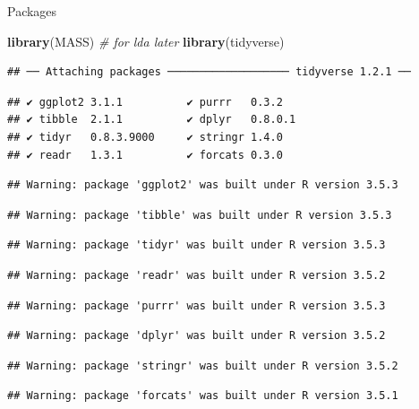 \documentclass[ignorenonframetext,]{beamer}
\newenvironment{Shaded}{\begin{snugshade}}{\end{snugshade}}
\newcommand{\CommentTok}[1]{\textcolor[rgb]{0.56,0.35,0.01}{\textit{#1}}}
\newcommand{\KeywordTok}[1]{\textcolor[rgb]{0.13,0.29,0.53}{\textbf{#1}}}
\newcommand{\NormalTok}[1]{#1}
\begin{document}
\begin{frame}[fragile]{Packages}
\protect\hypertarget{packages-7}{}

\begin{Shaded}
\begin{Highlighting}[]
\KeywordTok{library}\NormalTok{(MASS) }\CommentTok{# for lda later}
\KeywordTok{library}\NormalTok{(tidyverse)}
\end{Highlighting}
\end{Shaded}

\begin{verbatim}
## ── Attaching packages ─────────────────── tidyverse 1.2.1 ──
\end{verbatim}

\begin{verbatim}
## ✔ ggplot2 3.1.1          ✔ purrr   0.3.2     
## ✔ tibble  2.1.1          ✔ dplyr   0.8.0.1   
## ✔ tidyr   0.8.3.9000     ✔ stringr 1.4.0     
## ✔ readr   1.3.1          ✔ forcats 0.3.0
\end{verbatim}

\begin{verbatim}
## Warning: package 'ggplot2' was built under R version 3.5.3
\end{verbatim}

\begin{verbatim}
## Warning: package 'tibble' was built under R version 3.5.3
\end{verbatim}

\begin{verbatim}
## Warning: package 'tidyr' was built under R version 3.5.3
\end{verbatim}

\begin{verbatim}
## Warning: package 'readr' was built under R version 3.5.2
\end{verbatim}

\begin{verbatim}
## Warning: package 'purrr' was built under R version 3.5.3
\end{verbatim}

\begin{verbatim}
## Warning: package 'dplyr' was built under R version 3.5.2
\end{verbatim}

\begin{verbatim}
## Warning: package 'stringr' was built under R version 3.5.2
\end{verbatim}

\begin{verbatim}
## Warning: package 'forcats' was built under R version 3.5.1
\end{verbatim}


\end{frame}
\end{document}
